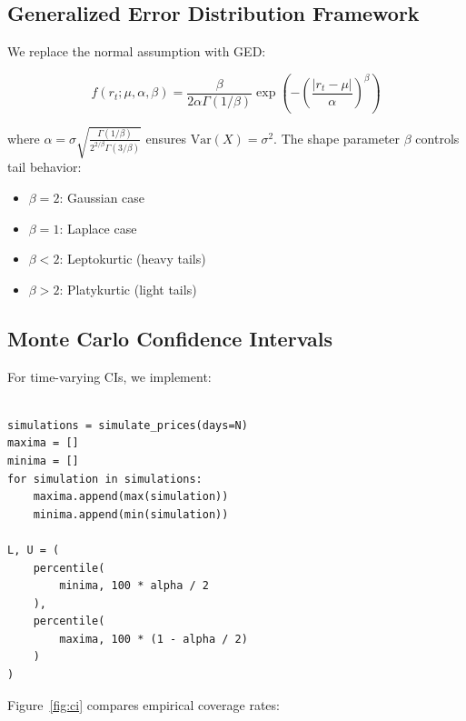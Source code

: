 \documentclass[12pt]{article}
\begin{document}
\subsection{Generalized Error Distribution Framework}
We replace the normal assumption with GED:

\begin{equation}
    f(r_t; \mu, \alpha, \beta) = \frac{\beta}{2\alpha\Gamma(1/\beta)} \exp\left(-\left(\frac{|r_t-\mu|}{\alpha}\right)^\beta\right)
\end{equation}

where $\alpha = \sigma \sqrt{\frac{\Gamma(1/\beta)}{2^{2/\beta}\Gamma(3/\beta)}}$ ensures $\text{Var}(X) = \sigma^2$. The shape parameter $\beta$ controls tail behavior:

\begin{itemize}
    \item $\beta = 2$: Gaussian case
    \item $\beta = 1$: Laplace case
    \item $\beta < 2$: Leptokurtic (heavy tails)
    \item $\beta > 2$: Platykurtic (light tails)
\end{itemize}

\subsection{Monte Carlo Confidence Intervals}
For time-varying CIs, we implement:

\begin{lstlisting}

simulations = simulate_prices(days=N)
maxima = []
minima = []
for simulation in simulations:
    maxima.append(max(simulation))
    minima.append(min(simulation))

L, U = (
    percentile(
        minima, 100 * alpha / 2
    ),
    percentile(
        maxima, 100 * (1 - alpha / 2)
    )
)

\end{lstlisting}

Figure~\ref{fig:ci} compares empirical coverage rates:
\end{document}
